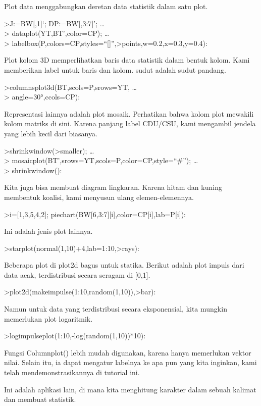 \documentclass[
]{book}
\begin{document}
Plot data menggabungkan deretan data statistik dalam satu plot.

\textgreater J:=BW{[},1{]}`; DP:=BW{[},3:7{]}'; \ldots{}\\
\textgreater{} dataplot(YT,BT',color=CP); \ldots{}\\
\textgreater{} labelbox(P,colors=CP,styles=``{[}{]}'',\textgreater points,w=0.2,x=0.3,y=0.4):

Plot kolom 3D memperlihatkan baris data statistik dalam bentuk kolom. Kami memberikan label untuk baris dan kolom. sudut adalah sudut pandang.

\textgreater columnsplot3d(BT,scols=P,srows=YT, \ldots{}\\
\textgreater{} angle=30°,ccols=CP):

Representasi lainnya adalah plot mosaik. Perhatikan bahwa kolom plot mewakili kolom matriks di sini. Karena panjang label CDU/CSU, kami mengambil jendela yang lebih kecil dari biasanya.

\textgreater shrinkwindow(\textgreater smaller); \ldots{}\\
\textgreater{} mosaicplot(BT',srows=YT,scols=P,color=CP,style=``\#''); \ldots{}\\
\textgreater{} shrinkwindow():

Kita juga bisa membuat diagram lingkaran. Karena hitam dan kuning membentuk koalisi, kami menyusun ulang elemen-elemennya.

\textgreater i={[}1,3,5,4,2{]}; piechart(BW{[}6,3:7{]}{[}i{]},color=CP{[}i{]},lab=P{[}i{]}):

Ini adalah jenis plot lainnya.

\textgreater starplot(normal(1,10)+4,lab=1:10,\textgreater rays):

Beberapa plot di plot2d bagus untuk statika. Berikut adalah plot impuls dari data acak, terdistribusi secara seragam di {[}0,1{]}.

\textgreater plot2d(makeimpulse(1:10,random(1,10)),\textgreater bar):

Namun untuk data yang terdistribusi secara eksponensial, kita mungkin memerlukan plot logaritmik.

\textgreater logimpulseplot(1:10,-log(random(1,10))*10):

Fungsi Columnplot() lebih mudah digunakan, karena hanya memerlukan vektor nilai. Selain itu, ia dapat mengatur labelnya ke apa pun yang kita inginkan, kami telah mendemonstrasikannya di tutorial ini.

Ini adalah aplikasi lain, di mana kita menghitung karakter dalam sebuah kalimat dan membuat statistik.
\end{document}
